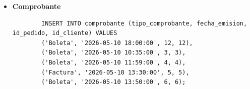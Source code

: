 \begin{itemize}
    \begin{listing}[H]
        \centering
        \begin{verbatim}
        INSERT INTO detalle_pedido (id_pedido, id_producto, cantidad, subtotal) VALUES
        (1, 1, 1, 38.00),
        (1, 16, 1, 15.00),
        (2, 4, 2, 70.00),
        (2, 17, 2, 10.00),
        (3, 7, 1, 65.00);
        \end{verbatim}
        \caption{Fragmento de código SQL para la inserción de registros en la tabla \texttt{detalle\_pedido}.}
        \label{lst:insert_detalle_pedido}
    \end{listing}
    \item \textbf{Comprobante}
    \begin{listing}[H]
        \centering
        \begin{verbatim}
        INSERT INTO comprobante (tipo_comprobante, fecha_emision, id_pedido, id_cliente) VALUES
        ('Boleta', '2026-05-10 18:00:00', 12, 12),
        ('Boleta', '2026-05-10 10:35:00', 3, 3),
        ('Boleta', '2026-05-10 11:59:00', 4, 4),
        ('Factura', '2026-05-10 13:30:00', 5, 5),
        ('Boleta', '2026-05-10 13:50:00', 6, 6);
        \end{verbatim}
        \caption{Fragmento de código SQL para la inserción de registros en la tabla \texttt{comprobante}.}
        \label{lst:insert_comprobante}
    \end{listing}

\end{itemize}
